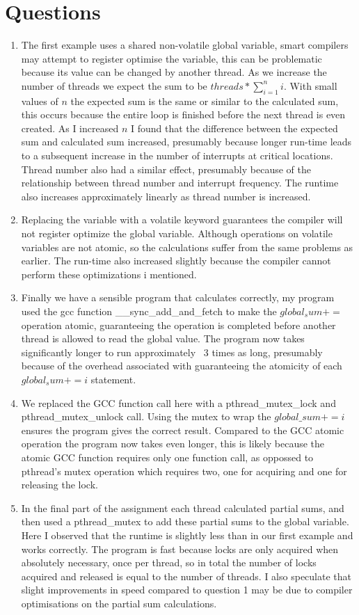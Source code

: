 \documentclass[12pt]{article}
\begin{document}
\section{Questions} 
\begin{enumerate}
\item The first example uses a shared non-volatile global variable, smart compilers may attempt to register optimise the variable, this can be problematic because its
    value can be changed by another thread. As we increase the number of threads we expect the sum to be $ threads * \sum_{i=1}^{n} i$. With small values of $ n $
    the expected sum is the same or similar to the calculated sum, this occurs because the entire loop is finished before the next thread is even created. As I increased $ n $ I found that the difference between the expected sum and calculated sum increased, presumably because longer run-time leads to a subsequent increase in the number of interrupts at critical locations. Thread number also had a similar effect, presumably because of the relationship between thread number and interrupt frequency. The runtime also increases approximately linearly as thread number is increased. 
    
\item Replacing the variable with a volatile keyword guarantees the compiler will not register optimize the global variable. Although operations on volatile variables are not atomic, so the calculations suffer from the same problems as earlier. The run-time also increased slightly because the compiler cannot perform these optimizations i mentioned. 
\item
    Finally we have a sensible program that calculates correctly, my program used the gcc function \_\_sync\_add\_and\_fetch\(\) to make the $ global_sum +=  $ operation atomic, guaranteeing the operation is completed before another thread is allowed to read the global value. The program now takes significantly longer to run approximately ~3 times as long, presumably because of the overhead associated with guaranteeing the atomicity of each $ global_sum += i $ statement. 
\item 
    We replaced the GCC function call here with a pthread\_mutex\_lock and pthread\_mutex\_unlock call. Using the mutex to wrap the $ global\_sum += i $ ensures the program gives the correct result. Compared to the GCC atomic operation the program now takes even longer, this is likely because the atomic GCC function requires only one function call, as oppossed to pthread's mutex operation which requires two, one for acquiring and one for releasing the lock.  
\item
    In the final part of the assignment each thread calculated partial sums, and then used a pthread\_mutex to add these partial sums to the global variable. Here I observed that the runtime is slightly less than in our first example and works correctly. The program is fast because locks are only acquired when absolutely necessary, once per thread, so in total the number of locks acquired and released is equal to the number of threads. I also speculate that slight improvements in speed compared to question 1 may be due to compiler optimisations on the partial sum calculations.  
            
\end{enumerate} 
\end{document}
